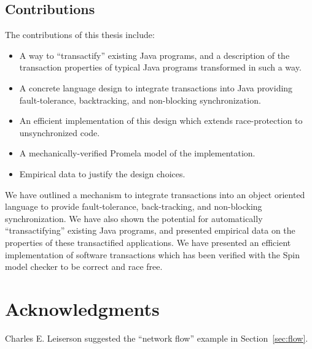 \documentclass[12pt]{article}
\newcommand{\note}[1]{}%
\newcommand{\punt}[1]{}%
\newcommand{\subsecput}[2]{\subsection{#2}\label{sec:#1}}
\newcommand{\figref}[1]         {Figure~\ref{fig:#1}}
\newcommand{\secref}[1]         {Section~\ref{sec:#1}}
\begin{document}
\subsecput{contrib}{Contributions}
The contributions of this thesis include:
\begin{itemize}
\item A way to ``transactify'' existing Java programs, and a
  description of the transaction properties of typical Java programs
  transformed in such a way.
\item A concrete language design to integrate transactions into Java
  providing fault-tolerance, backtracking, and non-blocking
  synchronization.
\item An efficient implementation of this design which extends
  race-protection to unsynchronized code.
\item A mechanically-verified Promela model of the implementation.
\item Empirical data to justify the design choices.
\punt{
\item Compiler optimizations to improve the speed of software
  transactions.
\item An application of fast functional arrays to solve the ``large
  object'' problem with Herlihy's universal non-blocking protocol.
  \note{Short section; cite my Area Exam as a Technical Report here
  for more details. Omit this?}
\item A variation of the implementation which leverages hardware
  support for small transactions.  This allows hardware small
  transactions to be bootstrapped to provide efficient large
  transactions.
}
\end{itemize}

We have outlined a mechanism to integrate transactions into an object
oriented language to provide fault-tolerance, back-tracking, and
non-blocking synchronization.  We have also shown the potential for
automatically ``transactifying'' existing Java programs, and presented
empirical data on the properties of these transactified applications.
We have
presented an efficient implementation of software transactions which
has been verified with the Spin model checker to be correct and race
free.

\section*{Acknowledgments}
Charles E. Leiserson suggested the ``network flow'' example in
\secref{flow}.
\punt{Sean Lie adapted the hardware simulator which
provided the timings in \figref{hw-timings}.}
\end{document}
